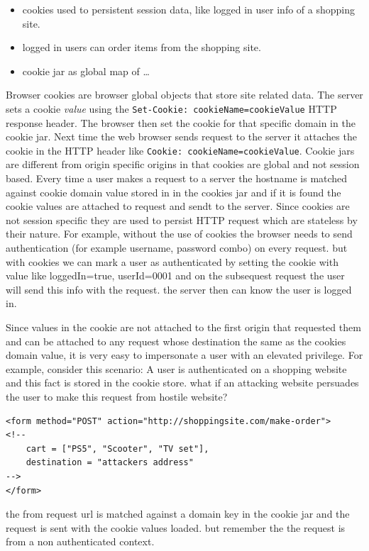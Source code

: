 \documentclass[a4paper]{article}
\begin{document}
\begin{itemize}
    \item cookies used to persistent session data, like logged in user info of a shopping site.
    \item logged in users can order items from the shopping site.
    \item cookie jar as global map of \dots
\end{itemize}

Browser cookies are browser global objects that store site related data. The server sets a cookie \emph{value} using the 
\lstinline{Set-Cookie: cookieName=cookieValue} HTTP response header. The browser then set the cookie for that specific domain
in the cookie jar. Next time the web browser sends request to the server it attaches the cookie in the HTTP header like 
\lstinline{Cookie: cookieName=cookieValue}. Cookie jars are different from origin specific origins in that cookies are global and
not session based. Every time a user makes a request to a server the hostname is matched against cookie domain value stored in 
in the cookies jar and if it is found the cookie values are attached to request and sendt to the server. Since cookies are not
session specific they are used to persist HTTP request which are stateless by their nature. For example, without the use of 
cookies the browser needs to send authentication (for example username, password combo) on every request. but with cookies we can
mark a user as authenticated by setting the cookie with value like loggedIn=true, userId=0001 and on the subsequest request the 
user will send this info with the request. the server then can know the user is logged in.

Since values in the cookie are not attached to the first origin that requested them and can be attached to any request whose
destination the same as the cookies domain value, it is very easy to impersonate a user with an elevated privilege. For example,
consider this scenario: A user is authenticated on a shopping website and this fact is stored in the cookie store. what if an
attacking website persuades the user to make this request from hostile website?

\begin{lstlisting}
<form method="POST" action="http://shoppingsite.com/make-order">
<!--
    cart = ["PS5", "Scooter", "TV set"],
    destination = "attackers address"
-->
</form>
\end{lstlisting}

the from request url is matched against a domain key in the cookie jar and the request is sent with the cookie values loaded.
but remember the the request is from a non authenticated context.
\end{document}
